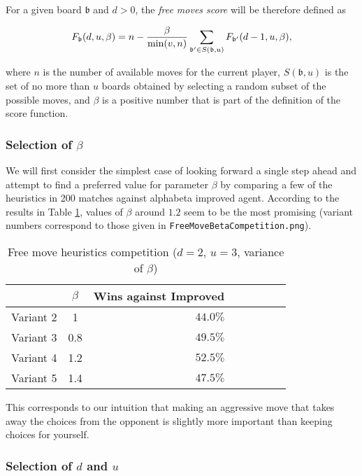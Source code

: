 \documentclass[oneside]{article}   	%
\begin{document}
For a given board $\mathfrak b$ and $d>0$, the \textit{free moves score} will be therefore defined as

$$ F_{\mathfrak b}(d, u, \beta) = n - {\beta \over \mathrm{min}(v, n)}  \sum_{{\mathfrak b}' \in S({\mathfrak b}, u)} F_{{\mathfrak b}'}(d-1, u, \beta),$$

where $n$ is the number of available moves for the current player, $S({\mathfrak b}, u)$ is the set of no more than $u$ boards obtained by selecting a random subset of the possible moves, and $\beta$ is a positive number that is part of the definition of the score function. 

\subsubsection{Selection of $\beta$}
\label{FreeMoveBetaCompetitions}

We will first consider the simplest case of looking forward a single step ahead and attempt to find a preferred value for parameter $\beta$ by comparing a few of the heuristics in 200 matches against alphabeta improved agent. According to the results in Table \ref{FreeMoveBetaCompetition}, values of $\beta$ around $1.2$ seem to be the most promising (variant numbers correspond to those given in \texttt{FreeMoveBetaCompetition.png}).

\begin{table}[htp]
\caption{Free move heuristics competition ($d=2$, $u=3$, variance of $\beta$)}
\begin{center}
\begin{tabular}{c|c|rcccc|c}
    & $\beta$ & Wins against Improved \\
   \hline
 Variant 2  & 1 & $44.0\%$ \\
 Variant 3  & 0.8 & $49.5\%$ \\
 Variant 4  & 1.2 & $52.5\%$ \\
 Variant 5  & 1.4 & $47.5\%$ \\ 
\end{tabular}
\end{center}
\label{FreeMoveBetaCompetition}
\end{table}%

This corresponds to our intuition that making an aggressive move that takes away
the choices from the opponent is slightly more important than keeping choices for yourself.

\subsubsection{Selection of $d$ and $u$}
\label{FreeMoveDUCompetitions}
\end{document}
